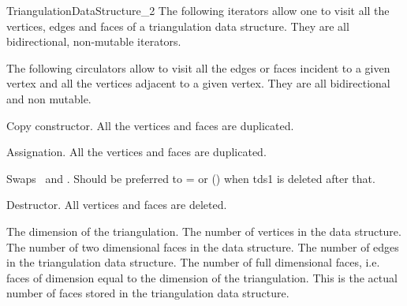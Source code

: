 \begin{ccRefConcept}{TriangulationDataStructure_2}
The following iterators allow one to visit all the vertices, edges
and  faces
of a triangulation data structure. They are all
bidirectional, non-mutable iterators.
\ccGlue
{}
\ccGlue
{}


The following circulators allow to visit all the edges or faces
incident to a given vertex and all the vertices
adjacent to a given vertex.  They are all bidirectional and non mutable.
\ccGlue
{}
\ccGlue
{}
 




\ccCreation
{}  %


{Copy constructor. All the vertices and faces are duplicated.}

{Assignation. All the vertices and faces are duplicated.}

{Swaps \ccVar\ and . Should be preferred to \ccVar= or \ccVar()
when tds1 is deleted after that.}

\ccModifierCrossRefOff
{}
{Destructor. All vertices and faces are deleted.}
\ccModifierCrossRefOff

\ccAccessFunctions
{}
{The dimension of the triangulation.}
\ccGlue
{}
{The number of vertices in the data structure.}
\ccGlue
{}
{The number of two dimensional faces in the data structure.}
\ccGlue
{}
{The number of edges  in the triangulation data structure.}
\ccGlue
{}
{The number of full dimensional faces, 
i.e. faces of dimension equal to the dimension
of the triangulation. This is the actual
number of faces stored in the triangulation data structure.}

\begin{ccAdvanced}
\end{ccAdvanced}


\end{ccRefConcept}
